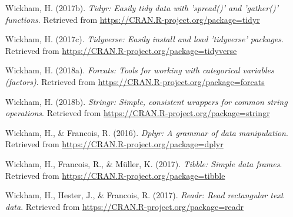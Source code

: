 \documentclass[english,man]{apa6}
\theoremstyle{definition}
\theoremstyle{definition}
\theoremstyle{definition}
\theoremstyle{remark}
\begin{document}
\hypertarget{ref-R-tidyr}{}
Wickham, H. (2017b). \emph{Tidyr: Easily tidy data with 'spread()' and
'gather()' functions}. Retrieved from
\url{https://CRAN.R-project.org/package=tidyr}

\hypertarget{ref-R-tidyverse}{}
Wickham, H. (2017c). \emph{Tidyverse: Easily install and load
'tidyverse' packages}. Retrieved from
\url{https://CRAN.R-project.org/package=tidyverse}

\hypertarget{ref-R-forcats}{}
Wickham, H. (2018a). \emph{Forcats: Tools for working with categorical
variables (factors)}. Retrieved from
\url{https://CRAN.R-project.org/package=forcats}

\hypertarget{ref-R-stringr}{}
Wickham, H. (2018b). \emph{Stringr: Simple, consistent wrappers for
common string operations}. Retrieved from
\url{https://CRAN.R-project.org/package=stringr}

\hypertarget{ref-R-dplyr}{}
Wickham, H., \& Francois, R. (2016). \emph{Dplyr: A grammar of data
manipulation}. Retrieved from
\url{https://CRAN.R-project.org/package=dplyr}

\hypertarget{ref-R-tibble}{}
Wickham, H., Francois, R., \& Müller, K. (2017). \emph{Tibble: Simple
data frames}. Retrieved from
\url{https://CRAN.R-project.org/package=tibble}

\hypertarget{ref-R-readr}{}
Wickham, H., Hester, J., \& Francois, R. (2017). \emph{Readr: Read
rectangular text data}. Retrieved from
\url{https://CRAN.R-project.org/package=readr}
\end{document}
